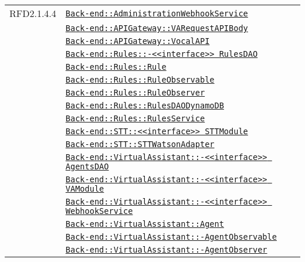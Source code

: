 \begin{longtable}{|>{\centering}m{3cm}|m{10cm}<{\centering}|}
RFD2.1.4.4 & \hyperref[Back-end::AdministrationWebhookService]{\texttt{Back-end::AdministrationWebhookService}}\\
& \hyperref[Back-end::APIGateway::VARequestAPIBody]{\texttt{Back-end::APIGateway::VARequestAPIBody}}\\
& \hyperref[Back-end::APIGateway::VocalAPI]{\texttt{Back-end::APIGateway::VocalAPI}}\\
& \hyperref[Back-end::Rules::<<interface>> RulesDAO]{\texttt{Back-end::Rules::-\linebreak <<interface>> RulesDAO}}\\
& \hyperref[Back-end::Rules::Rule]{\texttt{Back-end::Rules::Rule}}\\
& \hyperref[Back-end::Rules::RuleObservable]{\texttt{Back-end::Rules::RuleObservable}}\\
& \hyperref[Back-end::Rules::RuleObserver]{\texttt{Back-end::Rules::RuleObserver}}\\
& \hyperref[Back-end::Rules::RulesDAODynamoDB]{\texttt{Back-end::Rules::RulesDAODynamoDB}}\\
& \hyperref[Back-end::Rules::RulesService]{\texttt{Back-end::Rules::RulesService}}\\
& \hyperref[Back-end::STT::<<interface>> STTModule]{\texttt{Back-end::STT::<<interface>> STTModule}}\\
& \hyperref[Back-end::STT::STTWatsonAdapter]{\texttt{Back-end::STT::STTWatsonAdapter}}\\
& \hyperref[Back-end::VirtualAssistant::<<interface>> AgentsDAO]{\texttt{Back-end::VirtualAssistant::-\linebreak <<interface>> AgentsDAO}}\\
& \hyperref[Back-end::VirtualAssistant::<<interface>> VAModule]{\texttt{Back-end::VirtualAssistant::-\linebreak <<interface>> VAModule}}\\
& \hyperref[Back-end::VirtualAssistant::<<interface>> WebhookService]{\texttt{Back-end::VirtualAssistant::-\linebreak <<interface>> WebhookService}}\\
& \hyperref[Back-end::VirtualAssistant::Agent]{\texttt{Back-end::VirtualAssistant::Agent}}\\
& \hyperref[Back-end::VirtualAssistant::AgentObservable]{\texttt{Back-end::VirtualAssistant::-\linebreak AgentObservable}}\\
& \hyperref[Back-end::VirtualAssistant::AgentObserver]{\texttt{Back-end::VirtualAssistant::-\linebreak AgentObserver}}\\

\end{longtable}
